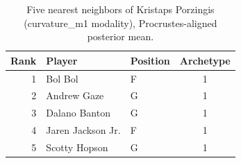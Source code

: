 \begin{table}[htbp]
  \centering\small
  \begin{tabular}{rllc}
    \toprule
    Rank & Player & Position & Archetype \\
    \midrule
    1 & Bol Bol & F & 1 \\
    2 & Andrew Gaze & G & 1 \\
    3 & Dalano Banton & G & 1 \\
    4 & Jaren Jackson Jr. & F & 1 \\
    5 & Scotty Hopson & G & 1 \\
    \bottomrule
  \end{tabular}
  \caption{Five nearest neighbors of Kristaps Porzingis (curvature_m1 modality), Procrustes-aligned posterior mean.}
  \label{tab:Kristaps_Porzingis_neighbors_curvature_m1}
\end{table}

